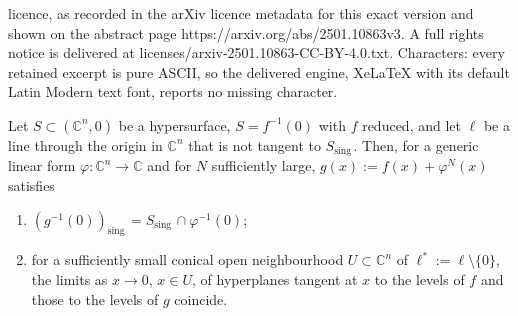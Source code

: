 \documentclass[10pt,a4paper]{amsart}
\DeclareMathOperator{\sing}{sing \, }
\newcommand{\C}{\mathbb{C}}
\begin{document}
licence, as recorded in the arXiv licence metadata for this exact version and shown on the abstract page https://arxiv.org/abs/2501.10863v3. A full rights notice is delivered at licenses/arxiv-2501.10863-CC-BY-4.0.txt. Characters: every retained excerpt is pure ASCII, so the delivered engine, XeLaTeX with its default Latin Modern text font, reports no missing character.
 \begin{lemma}\label{lem:nonisolates}
Let $S\subset (\C^n,0)$ be a hypersurface, $S=f^{-1} (0)$ with $f$ reduced, and let $\ell$ be a line through the origin in $\C^n$ that is not tangent to $S_{\sing}$.  Then, for a generic linear form $\varphi: \C^ n\to \C$ and for $N$ sufficiently large,   
$g(x):= f(x) + \varphi^N(x)$ satisfies 
\begin{enumerate}[label=\roman*)] 
\item  
$(g^{-1} (0))_{\sing}= S_{\sing} \cap \varphi^{-1} (0)$; 
\item 
for a sufficiently small conical open neighbourhood $U\subset \C^n$ of $\ell^*:= \ell \setminus \{0\}$,  
the limits as $x\to 0$, $x\in U$,  of hyperplanes tangent at $x$ to the levels of $f$ and those to the levels of $g$  coincide.  
\end{enumerate}
 \end{lemma}
\end{document}
